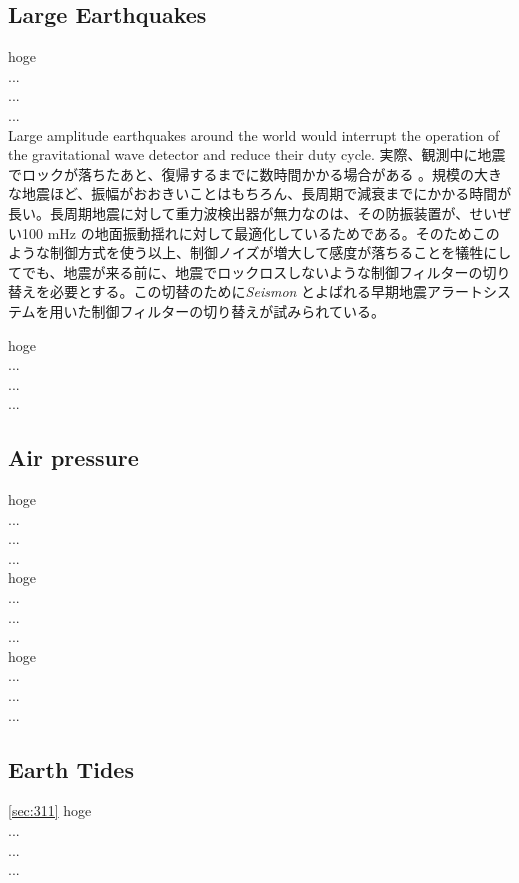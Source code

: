 \subsection{Large Earthquakes} \label{sec:313}
hoge\\
...\\
...\\
...\\

Large amplitude earthquakes around the world would interrupt the operation of the gravitational wave detector and reduce their duty cycle. 実際、観測中に地震でロックが落ちたあと、復帰するまでに数時間かかる場合がある \cite{Coughlin2015real}。規模の大きな地震ほど、振幅がおおきいことはもちろん、長周期で減衰までにかかる時間が長い。長周期地震に対して重力波検出器が無力なのは、その防振装置が、せいぜい100 $\mathrm{mHz}$ の地面振動揺れに対して最適化しているためである\cite{}。そのためこのような制御方式を使う以上、制御ノイズが増大して感度が落ちることを犠牲にしてでも、地震が来る前に、地震でロックロスしないような制御フィルターの切り替えを必要とする。この切替のために\textit{Seismon} とよばれる早期地震アラートシステム\cite{Coughlin2017limiting}を用いた制御フィルターの切り替えが試みられている\cite{Biscans2018control}。

hoge\\
...\\
...\\
...\\

\subsection{Air pressure} \label{sec:314}
hoge\\
...\\
...\\
...\\

hoge\\
...\\
...\\
...\\

hoge\\
...\\
...\\
...\\

\subsection{Earth Tides} \label{sec:315}
\cref{sec:311}
hoge\\
...\\
...\\
...\\

